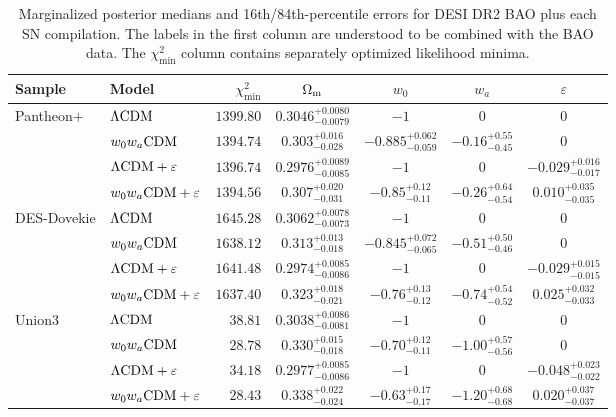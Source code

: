 \begin{table}[t]
\caption{Marginalized posterior medians and 16th/84th-percentile errors for DESI DR2 BAO plus each SN compilation. The labels in the first column are understood to be combined with the BAO data. The $\chi_{\min}^2$ column contains separately optimized likelihood minima.}\label{tab:posterior}
\begin{ruledtabular}
\begin{tabular}{llrcccc}
Sample & Model & $\chi^2_{\min}$ & $\Omega_{\rm m}$ & $w_0$ & $w_a$ & $\varepsilon$ \\
\hline\rule{0pt}{1.4em}%
Pantheon$+$ & $\Lambda{\rm CDM}$ & $1399.80$ & $0.3046^{+0.0080}_{-0.0079}$ & $-1$ & $0$ & $0$ \\[0.4em]
 & $w_0w_a{\rm CDM}$ & $1394.74$ & $0.303^{+0.016}_{-0.028}$ & $-0.885^{+0.062}_{-0.059}$ & $-0.16^{+0.55}_{-0.45}$ & $0$ \\[0.4em]
 & $\Lambda{\rm CDM} + \varepsilon$ & $1396.74$ & $0.2976^{+0.0089}_{-0.0085}$ & $-1$ & $0$ & $-0.029^{+0.016}_{-0.017}$ \\[0.4em]
 & $w_0w_a{\rm CDM} + \varepsilon$ & $1394.56$ & $0.307^{+0.020}_{-0.031}$ & $-0.85^{+0.12}_{-0.11}$ & $-0.26^{+0.64}_{-0.54}$ & $0.010^{+0.035}_{-0.035}$ \\[0.4em]
\hline\rule{0pt}{1.4em}%
DES-Dovekie & $\Lambda{\rm CDM}$ & $1645.28$ & $0.3062^{+0.0078}_{-0.0073}$ & $-1$ & $0$ & $0$ \\[0.4em]
 & $w_0w_a{\rm CDM}$ & $1638.12$ & $0.313^{+0.013}_{-0.018}$ & $-0.845^{+0.072}_{-0.065}$ & $-0.51^{+0.50}_{-0.46}$ & $0$ \\[0.4em]
 & $\Lambda{\rm CDM} + \varepsilon$ & $1641.48$ & $0.2974^{+0.0085}_{-0.0086}$ & $-1$ & $0$ & $-0.029^{+0.015}_{-0.015}$ \\[0.4em]
 & $w_0w_a{\rm CDM} + \varepsilon$ & $1637.40$ & $0.323^{+0.018}_{-0.021}$ & $-0.76^{+0.13}_{-0.12}$ & $-0.74^{+0.54}_{-0.52}$ & $0.025^{+0.032}_{-0.033}$ \\[0.4em]
\hline\rule{0pt}{1.4em}%
Union3 & $\Lambda{\rm CDM}$ & $38.81$ & $0.3038^{+0.0086}_{-0.0081}$ & $-1$ & $0$ & $0$ \\[0.4em]
 & $w_0w_a{\rm CDM}$ & $28.78$ & $0.330^{+0.015}_{-0.018}$ & $-0.70^{+0.12}_{-0.11}$ & $-1.00^{+0.57}_{-0.56}$ & $0$ \\[0.4em]
 & $\Lambda{\rm CDM} + \varepsilon$ & $34.18$ & $0.2977^{+0.0085}_{-0.0086}$ & $-1$ & $0$ & $-0.048^{+0.023}_{-0.022}$ \\[0.4em]
 & $w_0w_a{\rm CDM} + \varepsilon$ & $28.43$ & $0.338^{+0.022}_{-0.024}$ & $-0.63^{+0.17}_{-0.17}$ & $-1.20^{+0.68}_{-0.68}$ & $0.020^{+0.037}_{-0.037}$ \\[0.4em]

\end{tabular}
\end{ruledtabular}
\end{table}
